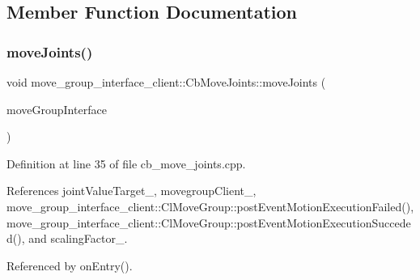 \subsection{Member Function Documentation}
\mbox{\label{classmove__group__interface__client_1_1CbMoveJoints_aa60670293a8fafcb6e091b85af722822}} 
\subsubsection{\texorpdfstring{move\+Joints()}{moveJoints()}}
{\footnotesize\ttfamily void move\+\_\+group\+\_\+interface\+\_\+client\+::\+Cb\+Move\+Joints\+::move\+Joints (\begin{DoxyParamCaption}\item[{moveit\+::planning\+\_\+interface\+::\+Move\+Group\+Interface \&}]{move\+Group\+Interface }\end{DoxyParamCaption})\hspace{0.3cm}{\ttfamily [protected]}}



Definition at line 35 of file cb\+\_\+move\+\_\+joints.\+cpp.



References joint\+Value\+Target\+\_\+, movegroup\+Client\+\_\+, move\+\_\+group\+\_\+interface\+\_\+client\+::\+Cl\+Move\+Group\+::post\+Event\+Motion\+Execution\+Failed(), move\+\_\+group\+\_\+interface\+\_\+client\+::\+Cl\+Move\+Group\+::post\+Event\+Motion\+Execution\+Succeded(), and scaling\+Factor\+\_\+.



Referenced by on\+Entry().


